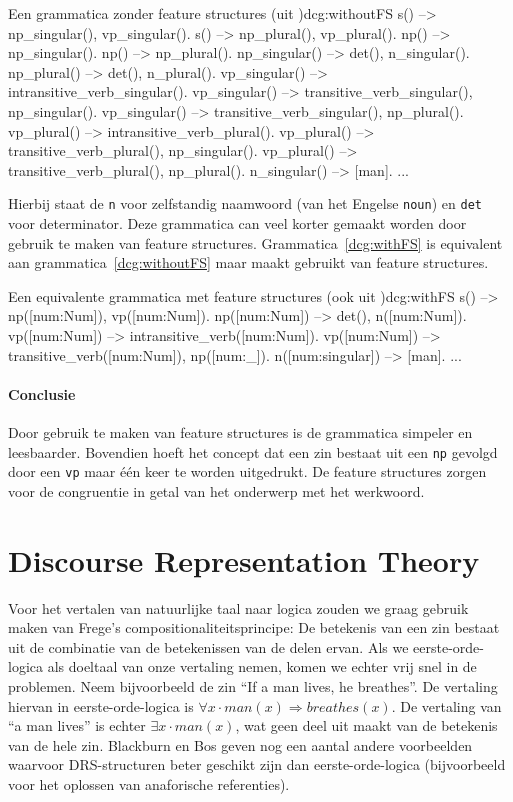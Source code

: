 \begin{dcg}{Een grammatica zonder feature structures (uit \cite{NLPCourse})}{dcg:withoutFS}
s() --> np_singular(), vp_singular().
s() --> np_plural(), vp_plural().
np() --> np_singular().
np() --> np_plural().
np_singular() --> det(), n_singular().
np_plural() --> det(), n_plural().
vp_singular() --> intransitive_verb_singular().
vp_singular() --> transitive_verb_singular(), np_singular().
vp_singular() --> transitive_verb_singular(), np_plural().
vp_plural() --> intransitive_verb_plural().
vp_plural() --> transitive_verb_plural(), np_singular().
vp_plural() --> transitive_verb_plural(), np_plural().
n_singular() --> [man].
...
\end{dcg}
Hierbij staat de \texttt{n} voor zelfstandig naamwoord (van het Engelse \texttt{noun}) en \texttt{det} voor determinator. Deze grammatica can veel korter gemaakt worden door gebruik te maken van feature structures. Grammatica~\ref{dcg:withFS} is equivalent aan grammatica~\ref{dcg:withoutFS} maar maakt gebruikt van feature structures.

\begin{dcg}{Een equivalente grammatica met feature structures (ook uit \cite{NLPCourse})}{dcg:withFS}
s() --> np([num:Num]), vp([num:Num]).
np([num:Num]) --> det(), n([num:Num]).
vp([num:Num]) --> intransitive_verb([num:Num]).
vp([num:Num]) --> transitive_verb([num:Num]), np([num:_]).
n([num:singular]) --> [man].
...
\end{dcg} 

\paragraph{Conclusie} Door gebruik te maken van feature structures is de grammatica simpeler en leesbaarder. Bovendien hoeft het concept dat een zin bestaat uit een \texttt{np} gevolgd door een \texttt{vp} maar \'e\'en keer te worden uitgedrukt. De feature structures zorgen voor de congruentie in getal van het onderwerp met het werkwoord. 

\section{Discourse Representation Theory}
Voor het vertalen van natuurlijke taal naar logica zouden we graag gebruik maken van Frege's compositionaliteitsprincipe: De betekenis van een zin bestaat uit de combinatie van de betekenissen van de delen ervan. Als we eerste-orde-logica als doeltaal van onze vertaling nemen, komen we echter vrij snel in de problemen. Neem bijvoorbeeld de zin ``If a man lives, he breathes''. De vertaling hiervan in eerste-orde-logica is $\forall x \cdot man(x) \Rightarrow breathes(x)$. De vertaling van ``a man lives'' is echter $\exists x \cdot man(x)$, wat geen deel uit maakt van de betekenis van de hele zin. Blackburn en Bos \cite{Blackburn2006} geven nog een aantal andere voorbeelden waarvoor DRS-structuren beter geschikt zijn dan eerste-orde-logica (bijvoorbeeld voor het oplossen van anaforische referenties).

